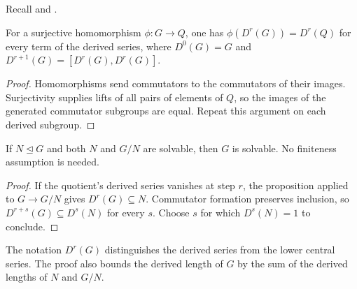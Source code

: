 Recall  and
.

\begin{proposition}\label{derived-homomorphisms}
For a surjective homomorphism $\phi:G\to Q$, one has
$\phi(D^r(G))=D^r(Q)$ for every term of the derived series, where
$D^0(G)=G$ and $D^{r+1}(G)=[D^r(G),D^r(G)]$.
\end{proposition}
\begin{proof}\label{derived-homomorphisms-proof}
Homomorphisms send commutators to the commutators of their images.
Surjectivity supplies lifts of all pairs of elements of $Q$, so the
images of the generated commutator subgroups are equal. Repeat this
argument on each derived subgroup.
\end{proof}
\begin{theorem}\label{solvable-extensions}
If $N\trianglelefteq G$ and both $N$ and $G/N$ are solvable, then
$G$ is solvable. No finiteness assumption is needed.
\end{theorem}
\begin{proof}\label{solvable-extensions-proof}
If the quotient's derived series vanishes at step $r$, the proposition
applied to $G\to G/N$ gives $D^r(G)\subseteq N$.
Commutator formation preserves inclusion, so
$D^{r+s}(G)\subseteq D^s(N)$ for every $s$. Choose $s$ for which
$D^s(N)=1$ to conclude.
\end{proof}
\begin{remark}\label{derived-notation}
The notation $D^r(G)$ distinguishes the derived series from the lower
central series. The proof also bounds the derived length of $G$ by
the sum of the derived lengths of $N$ and $G/N$.
\end{remark}
